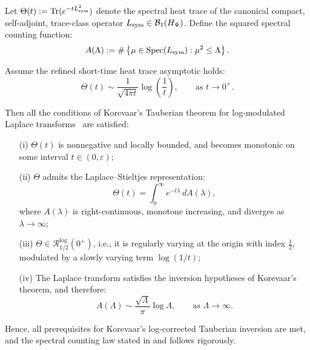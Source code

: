 \begin{lemma}
\label{lem:korevaar_tauberian_constants_verified}

Let \( \Theta(t) := \operatorname{Tr}(e^{-t L_{\mathrm{sym}}^2}) \) denote the spectral heat trace of the canonical compact, self-adjoint, trace-class operator \( L_{\mathrm{sym}} \in \mathcal{B}_1(H_{\Psi}) \). Define the squared spectral counting function:
\[
A(\Lambda) := \#\left\{ \mu \in \operatorname{Spec}(L_{\mathrm{sym}}) : \mu^2 \le \Lambda \right\}.
\]

Assume the refined short-time heat trace asymptotic holds:
\[
\Theta(t) \sim \frac{1}{\sqrt{4\pi t}} \log\left( \frac{1}{t} \right), \qquad \text{as } t \to 0^+.
\]

Then all the conditions of Korevaar’s Tauberian theorem for log-modulated Laplace transforms~\cite[Ch.~III, Thm.~5.5]{Korevaar2004Tauberian} are satisfied:

\begin{enumerate}
  \item[\textup{(i)}] \( \Theta(t) \) is nonnegative and locally bounded, and becomes monotonic on some interval \( t \in (0, \varepsilon) \);

  \item[\textup{(ii)}] \( \Theta \) admits the Laplace–Stieltjes representation:
  \[
  \Theta(t) = \int_0^\infty e^{-t \lambda} \, dA(\lambda),
  \]
  where \( A(\lambda) \) is right-continuous, monotone increasing, and diverges as \( \lambda \to \infty \);

  \item[\textup{(iii)}] \( \Theta \in \mathcal{R}_{1/2}^{\log}(0^+) \), i.e., it is regularly varying at the origin with index \( \tfrac{1}{2} \), modulated by a slowly varying term \( \log(1/t) \);

  \item[\textup{(iv)}] The Laplace transform satisfies the inversion hypotheses of Korevaar’s theorem, and therefore:
  \[
  A(\Lambda) \sim \frac{\sqrt{\Lambda}}{\pi} \log \Lambda, \qquad \text{as } \Lambda \to \infty.
  \]
\end{enumerate}

\noindent
Hence, all prerequisites for Korevaar’s log-corrected Tauberian inversion are met, and the spectral counting law stated in  and  follows rigorously.
\end{lemma}
